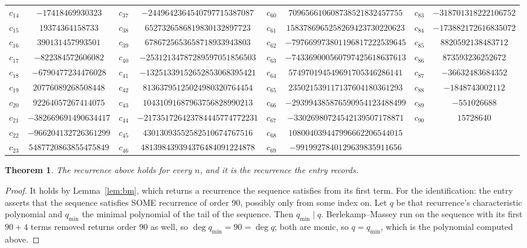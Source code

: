 \documentclass[11pt,a4paper]{article}
\theoremstyle{plain}
\newtheorem{theorem}{Theorem}
\theoremstyle{definition}
\begin{document}
\begin{center}
\begin{tabular}{cccccccc}
$c_{14}$ & $-17418469930323$ & $c_{37}$ & $-2449642364540797715387087$ & $c_{60}$ & $709656610608738521832457755$ & $c_{83}$ & $-318701318222106752$ \\
$c_{15}$ & $19374364158733$ & $c_{38}$ & $6527326586819830132897723$ & $c_{61}$ & $1583786965258269423730220623$ & $c_{84}$ & $-173882172616835072$ \\
$c_{16}$ & $390131457993501$ & $c_{39}$ & $6786725653658718933943803$ & $c_{62}$ & $-797669973801196817222539645$ & $c_{85}$ & $8820592138483712$ \\
$c_{17}$ & $-822384572606082$ & $c_{40}$ & $-25312134787289597051856503$ & $c_{63}$ & $-743369000560797425618637613$ & $c_{86}$ & $873593236252672$ \\
$c_{18}$ & $-6790477234476028$ & $c_{41}$ & $-13251339152652853068395421$ & $c_{64}$ & $574970194549691705346286141$ & $c_{87}$ & $-36632483684352$ \\
$c_{19}$ & $20776089268508448$ & $c_{42}$ & $81363795125024980320764454$ & $c_{65}$ & $235021539117137604180361293$ & $c_{88}$ & $-1848743002112$ \\
$c_{20}$ & $92264057267414075$ & $c_{43}$ & $10431091687963756828990213$ & $c_{66}$ & $-293994385876590954123488499$ & $c_{89}$ & $-551026688$ \\
$c_{21}$ & $-382669691490634417$ & $c_{44}$ & $-217351726423784445774772231$ & $c_{67}$ & $-33026980724542139507178871$ & $c_{90}$ & $15728640$ \\
$c_{22}$ & $-966204132726361299$ & $c_{45}$ & $43013093552582510674767516$ & $c_{68}$ & $108004039447996662206544015$ &  &  \\
$c_{23}$ & $5487720863855475849$ & $c_{46}$ & $481398439394376484091224878$ & $c_{69}$ & $-9919927840129639835911656$ &  &  \\
\end{tabular}
\end{center}

\begin{theorem}
The recurrence above holds for every $n$, and it is the recurrence the entry records.
\end{theorem}

\begin{proof}
It holds by Lemma~\ref{lem:bm}, which returns a recurrence the sequence satisfies from its
first term. For the identification: the entry asserts that the sequence satisfies SOME
recurrence of order $90$, possibly only from some index on. Let $q$ be that recurrence's
characteristic polynomial and $q_{\min}$ the minimal polynomial of the tail of the sequence.
Then $q_{\min}\mid q$. Berlekamp--Massey run on the sequence with its first $90+4$ terms
removed returns order $90$ as well, so $\deg q_{\min}=90=\deg q$; both are monic, so
$q=q_{\min}$, which is the polynomial computed above.
\end{proof}
\end{document}
